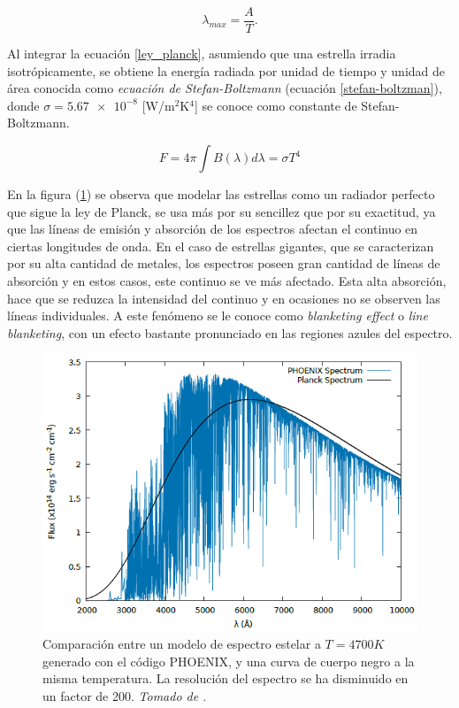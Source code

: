 \documentclass[12pt,oneside,openany,letter]{book}
\begin{document}
\begin{equation}
    \lambda_{max} =  \frac{A}{T}.
    \label{wien}
\end{equation}

\noindent Al integrar la ecuación \ref{ley_planck}, asumiendo que una estrella irradia isotrópicamente, se obtiene la energía radiada por unidad de tiempo y unidad de área conocida como \textit{ecuación de Stefan-Boltzmann} (ecuación \ref{stefan-boltzman}), donde $\sigma = \num{5,67 e-8}$ [W/m$^2$K$^4$] se conoce como constante de Stefan-Boltzmann.
\vspace{2mm}

\begin{equation}
    F = 4 \pi \int B(\lambda)  d\lambda = \sigma T^4
    \label{stefan-boltzman}
\end{equation}

\noindent En la figura  (\ref{fig:lineblanketing}) se observa que modelar las estrellas como un radiador perfecto que sigue la ley de Planck, se usa más por su sencillez que por su exactitud, ya que las líneas de emisión y absorción de los espectros afectan el continuo en ciertas longitudes de onda. En el caso de estrellas gigantes, que se caracterizan por su alta cantidad de metales, los espectros poseen gran cantidad de líneas de absorción y en estos casos, este continuo se ve más afectado. Esta alta absorción, hace que se reduzca la intensidad del continuo y en ocasiones no se observen las líneas individuales. A este fenómeno se le conoce como \textit{blanketing effect} o \textit{line blanketing}, con un efecto bastante pronunciado en las regiones azules del espectro.

\begin{figure}[H]
    \centering
    \includegraphics[width=0.85\linewidth]{Images/lineblanck.PNG}
    \caption[Comparación entre un modelo de espectro estelar a $T = 4700 K$ generado con el código PHOENIX, y una curva de cuerpo negro a la misma temperatura.]{Comparación entre un modelo de espectro estelar a $T = 4700 K$ generado con el código PHOENIX, y una curva de cuerpo negro a la misma temperatura. La resolución del espectro se ha disminuido en un factor de 200. \textit{Tomado de \citep{Faiber2019master}}.}
    \label{fig:lineblanketing}
\end{figure}
\end{document}
